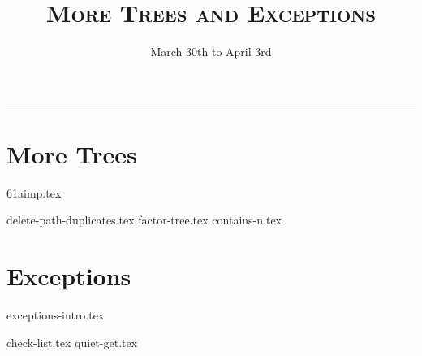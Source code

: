 \documentclass{exam}
\title{\textsc{More Trees and Exceptions}}
\date{March 30th to April 3rd}
\begin{document}
\maketitle
\rule{\textwidth}{0.15em}
\fontsize{12}{15}\selectfont


\section{More Trees}
{61aimp.tex}
\newpage

\begin{questions}
{delete-path-duplicates.tex}
{factor-tree.tex}
{contains-n.tex}
\newpage
\end{questions}

\section{Exceptions}
{exceptions-intro.tex}
\newpage

\begin{questions}
{check-list.tex}
{quiet-get.tex}
\end{questions}
\end{document}
